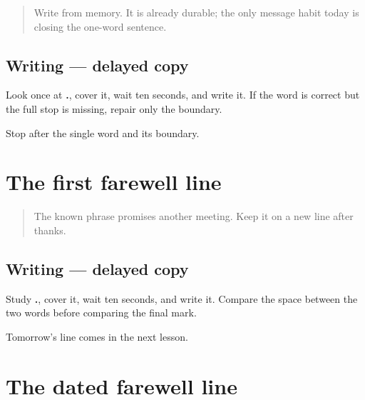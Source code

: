 \label{lesson:MR-A1M10-thanks-line}



\begin{quote}
Write \textbf{} from memory. It is already durable; the only message habit today is closing the one-word sentence.
\end{quote}

\subsection*{Writing — delayed copy}
Look once at \textbf{.}, cover it, wait ten seconds, and write it. If the word is correct but the full stop is missing, repair only the boundary.

\begin{tcolorbox}[breakable,colback=teal!4,colframe=teal!35!black,title={Before you move on}]
Stop after the single word and its boundary.
\end{tcolorbox}
\section[punhā bheṭū]{The first farewell line}

\label{lesson:MR-A1M11-again-line}



\begin{quote}
The known phrase \textbf{ } promises another meeting. Keep it on a new line after thanks.
\end{quote}

\subsection*{Writing — delayed copy}
Study \textbf{ .}, cover it, wait ten seconds, and write it. Compare the space between the two words before comparing the final mark.

\begin{tcolorbox}[breakable,colback=teal!4,colframe=teal!35!black,title={Before you move on}]
Tomorrow's line comes in the next lesson.
\end{tcolorbox}
\section[udyā bheṭū]{The dated farewell line}

\label{lesson:MR-A1M12-tomorrow-line}




